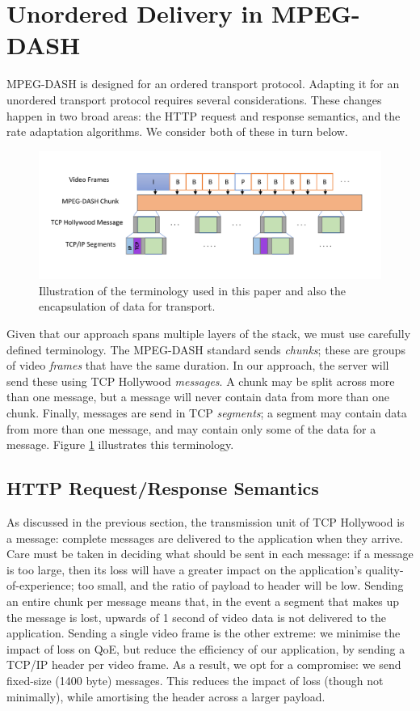 \section{Unordered Delivery in MPEG-DASH}
\label{sec:transport}

MPEG-DASH is designed for an ordered transport protocol. Adapting it for an
unordered transport protocol requires several considerations. These
changes happen in two broad areas: the HTTP request and response semantics, and the rate
adaptation algorithms. We consider both of these in turn below.

\begin{figure}
  \centering
  \includegraphics[width=\columnwidth]{figures/terminology2.pdf}
  \caption{Illustration of the terminology used in this paper and also the encapsulation of data for transport.}
  \label{fig:terminology}
\end{figure}

Given that our approach spans multiple layers of the stack, we must use carefully defined
terminology. The MPEG-DASH standard sends \emph{chunks}; these are groups of video
\emph{frames} that have the same duration. In our approach, the server will send these
using TCP Hollywood \emph{messages}. A chunk may be split across more than one message,
but a message will never contain data from more than one chunk. Finally, messages are
send in TCP \emph{segments}; a segment may contain data from more than one message, and
may contain only some of the data for a message.
Figure \ref{fig:terminology} illustrates this terminology.

\subsection{HTTP Request/Response Semantics}

As discussed in the previous section, the transmission unit of TCP Hollywood is a message:
complete messages are delivered to the application when they arrive. Care must be taken in
deciding what should be sent in each message: if a message is too large, then its loss
will have a greater impact on the application's quality-of-experience; too small, and the
ratio of payload to header will be low. Sending an entire chunk per message means that,
in the event a segment that makes up the message is lost, upwards of 1 second of video
data is not delivered to the application. Sending a single video frame is the
other extreme: we minimise the impact of loss on QoE, but reduce the efficiency of our
application, by sending a TCP/IP header per video frame. As a result, we opt for a
compromise: we send fixed-size (1400 byte) messages. This reduces the impact of loss 
(though not minimally), while amortising the header across a larger payload.

